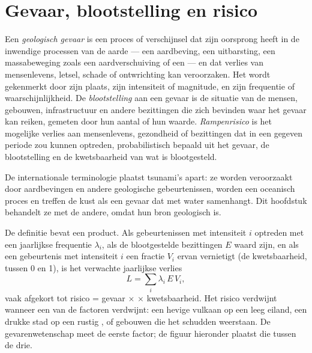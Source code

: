 \section{Gevaar, blootstelling en risico}\label{sec:b2:geological-hazards:risk}

\begin{definition}\label{def:b2:geological-hazards:risk}
Een \emph{geologisch gevaar} is een proces of verschijnsel dat zijn oorsprong heeft in
de inwendige processen van de aarde --- een aardbeving, een uitbarsting, een massabeweging zoals een
aardverschuiving of een  --- en dat verlies van mensenlevens, letsel, schade of ontwrichting kan veroorzaken. Het wordt
gekenmerkt door zijn plaats, zijn intensiteit of magnitude, en zijn frequentie of waarschijnlijkheid. De
\emph{blootstelling} aan een gevaar is de situatie van de mensen,
gebouwen, infrastructuur en andere bezittingen die zich bevinden waar het gevaar kan reiken, gemeten door hun
aantal of hun waarde. \emph{Rampenrisico} is het mogelijke verlies aan mensenlevens,
gezondheid of bezittingen dat in een gegeven periode zou kunnen optreden, probabilistisch bepaald uit het
gevaar, de blootstelling en de kwetsbaarheid van wat is blootgesteld.
\end{definition}

De internationale terminologie plaatst tsunami's apart: ze worden veroorzaakt door aardbevingen en andere
geologische gebeurtenissen, worden een oceanisch proces en treffen de kust als een gevaar dat met water samenhangt.
Dit hoofdstuk behandelt ze met de andere, omdat hun bron geologisch is.

De definitie bevat een product. Als gebeurtenissen met intensiteit $i$ optreden met een jaarlijkse frequentie
$\lambda_i$, als de blootgestelde bezittingen $E$ waard zijn, en als een gebeurtenis met intensiteit $i$ een
fractie $V_i$ ervan vernietigt (de kwetsbaarheid, tussen 0 en 1), is het verwachte jaarlijkse verlies
\begin{equation}
L = \sum_i \lambda_i \, E \, V_i ,
\label{eq:b2:geological-hazards:loss}
\end{equation}
vaak afgekort tot risico = gevaar $\times$  $\times$ kwetsbaarheid. Het risico verdwijnt wanneer
een van de factoren verdwijnt: een hevige vulkaan op een leeg eiland, een drukke stad op een rustig , of
gebouwen die het schudden weerstaan. De gevarenwetenschap meet de eerste factor; de figuur hieronder
plaatst die tussen de drie.

